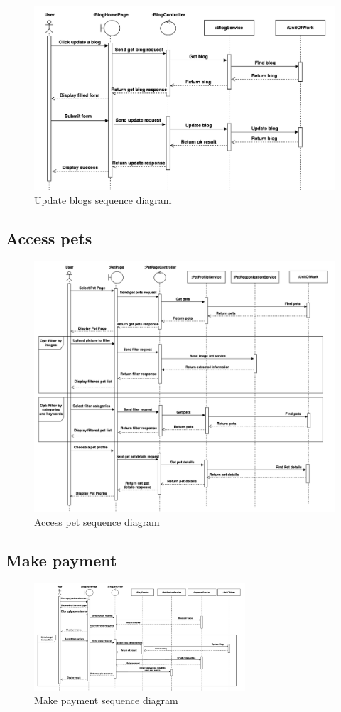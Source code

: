 \begin{figure}[H]
    \centering
    \includegraphics[width=1\textwidth]{Figures/update_blog_seq.png}
    \caption{Update blogs sequence diagram}
    \label{fig:update-blog-seq}
\end{figure}
\clearpage

\subsection{Access pets}
\begin{figure}[H]
    \centering
    \includegraphics[width=1\textwidth]{Figures/access_pet_seq.png}
    \caption{Access pet sequence diagram}
    \label{fig:access-pet-seq}
\end{figure}

\subsection{Make payment}

\begin{figure}[H]
    \centering
    \includegraphics[angle=-90,width=0.7\textwidth]{Figures/payment_seq.png}
    \caption{Make payment sequence diagram}
    \label{fig:make-payment-seq}
\end{figure}


